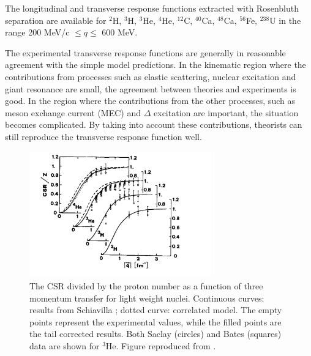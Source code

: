 The longitudinal and transverse response functions extracted with Rosenbluth separation are available for
$^2$H, $^3$H, $^3$He, $^4$He, $^{12}$C, $^{40}$Ca, $^{48}$Ca, $^{56}$Fe, $^{238}$U in the range 200 MeV/c $\leq q \leq$
600 MeV.

The experimental transverse response functions are generally in reasonable agreement with the simple model predictions.
In the kinematic region where the contributions from processes such as elastic scattering, nuclear
excitation and giant resonance are small, the agreement between theories and experiments is good.
In the region where the contributions from the other processes, such as meson exchange current (MEC) and $\Delta$ excitation are important,
the situation becomes complicated. By taking into account these contributions, theorists can still reproduce the transverse response function well.

\begin{figure}[h]
\centering
\includegraphics[width=0.7\textwidth]{figs/csr_data.png}
\caption[csr data]{The CSR divided by the proton number as a function of three momentum transfer
for light weight nuclei. Continuous curves: results from Schiavilla \cite{Schiavilla1987} ; dotted curve:
correlated model. The empty points represent the experimental values, while the filled points
are the tail corrected results. Both Saclay (circles) and Bates (squares) data are shown for $^3$He.
 Figure reproduced from \cite{Orlandini1991}.
\label{fig:csr_data}}
\end{figure}

